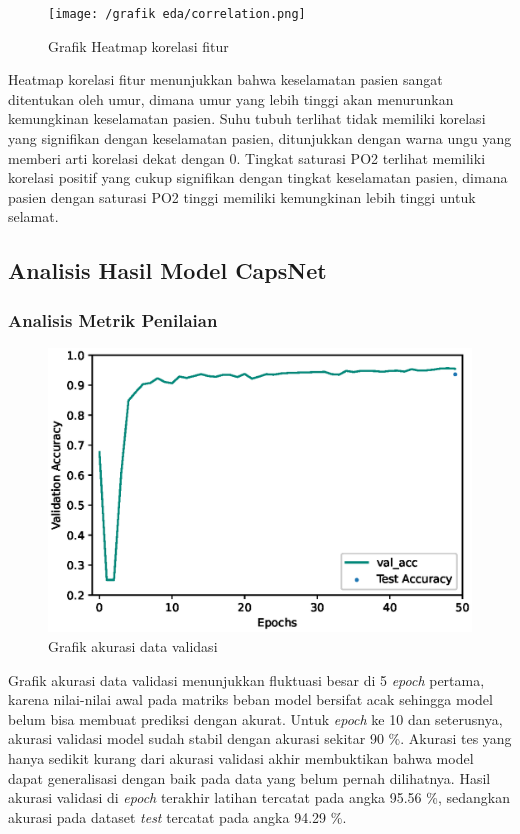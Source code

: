 \documentclass{article}
\begin{document}
		
		\begin{figure}[H]
			\centering
			\texttt{[image: /grafik eda/correlation.png]}
			\caption{Grafik Heatmap korelasi fitur}
		\end{figure}
		\par Heatmap korelasi fitur menunjukkan bahwa keselamatan pasien sangat ditentukan oleh umur, dimana umur yang lebih tinggi akan menurunkan kemungkinan keselamatan pasien. Suhu tubuh terlihat tidak memiliki korelasi yang signifikan dengan keselamatan pasien, ditunjukkan dengan warna ungu yang memberi arti korelasi dekat dengan 0. Tingkat saturasi PO2 terlihat memiliki korelasi positif yang cukup signifikan dengan tingkat keselamatan pasien, dimana pasien dengan saturasi PO2 tinggi memiliki kemungkinan lebih tinggi untuk selamat. 
    	
   	\subsection{Analisis Hasil Model CapsNet}
   		\subsubsection{Analisis Metrik Penilaian}   			
   			\begin{figure}[H]
   				\centering
   				\includegraphics[scale=1]{analisis model/final_acc.eps}
   				\caption{Grafik akurasi data validasi}
   			\end{figure}
   			
   			\par Grafik akurasi data validasi menunjukkan fluktuasi besar di 5 \textit{epoch} pertama, karena nilai-nilai awal pada matriks beban model bersifat acak sehingga model belum bisa membuat prediksi dengan akurat. Untuk \textit{epoch} ke 10 dan seterusnya, akurasi validasi model sudah stabil dengan akurasi sekitar 90 \%. Akurasi tes yang hanya sedikit kurang dari akurasi validasi akhir membuktikan bahwa model dapat generalisasi dengan baik pada data yang belum pernah dilihatnya. Hasil akurasi validasi di \textit{epoch} terakhir latihan tercatat pada angka 95.56 \%, sedangkan akurasi pada dataset \textit{test} tercatat pada angka 94.29 \%.
   			
\end{document}
